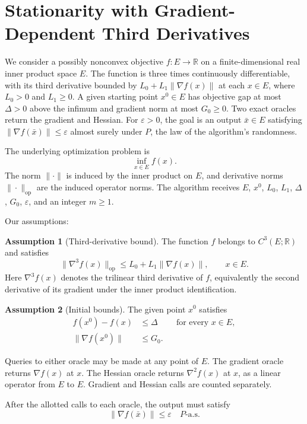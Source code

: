 \documentclass[10pt]{article}
\theoremstyle{definition}
\newtheorem{assumption}{Assumption}
\begin{document}
\section*{Stationarity with Gradient-Dependent Third Derivatives}
We consider a possibly nonconvex objective $f:E\to\mathbb{R}$ on a finite-dimensional real inner product space $E$. The function is three times continuously differentiable, with its third derivative bounded by $L_0+L_1\|\nabla f(x)\|$ at each $x\in E$, where $L_0>0$ and $L_1\geq0$. A given starting point $x^0\in E$ has objective gap at most $\Delta>0$ above the infimum and gradient norm at most $G_0\geq0$. Two exact oracles return the gradient and Hessian. For $\varepsilon>0$, the goal is an output $\bar{x}\in E$ satisfying $\|\nabla f(\bar{x})\|\leq\varepsilon$ almost surely under $P$, the law of the algorithm's randomness.

The underlying optimization problem is
\[
\inf_{x\in E} f(x).
\]
The norm $\|\cdot\|$ is induced by the inner product on $E$, and derivative norms $\|\cdot\|_{\mathrm{op}}$ are the induced operator norms. The algorithm receives $E$, $x^0$, $L_0$, $L_1$, $\Delta$, $G_0$, $\varepsilon$, and an integer $m\geq1$.

Our assumptions:
\begin{assumption}[Third-derivative bound]
The function $f$ belongs to $C^3(E;\mathbb{R})$ and satisfies
\[
\|\nabla^3 f(x)\|_{\mathrm{op}}
\leq L_0+L_1\|\nabla f(x)\|,
\qquad x\in E.
\]
Here $\nabla^3 f(x)$ denotes the trilinear third derivative of $f$, equivalently the second derivative of its gradient under the inner product identification.
\end{assumption}

\begin{assumption}[Initial bounds]
The given point $x^0$ satisfies
\[
\begin{aligned}
f(x^0)-f(x)&\leq\Delta &&\text{for every }x\in E,\\
\|\nabla f(x^0)\|&\leq G_0.
\end{aligned}
\]
\end{assumption}

Queries to either oracle may be made at any point of $E$. The gradient oracle returns $\nabla f(x)$ at $x$. The Hessian oracle returns $\nabla^2 f(x)$ at $x$, as a linear operator from $E$ to $E$. Gradient and Hessian calls are counted separately.

After the allotted calls to each oracle, the output must satisfy
\[
\|\nabla f(\bar{x})\|\leq\varepsilon
\quad P\text{-a.s.}
\]
\end{document}
